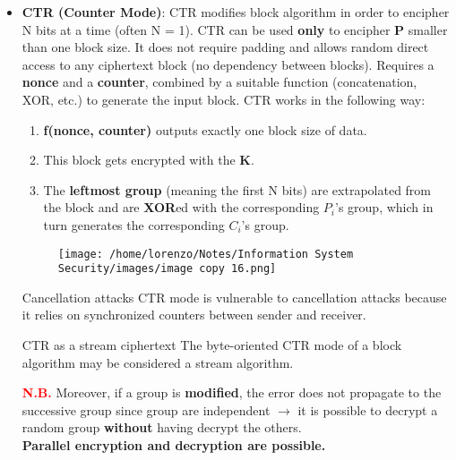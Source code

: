 \begin{itemize}
\begin{itemize}
    \vspace{0.1cm}
    \item \textbf{CTR (Counter Mode)}: CTR modifies block algorithm in order to encipher N bits at a time (often N = 1). CTR can be used \textbf{only} to encipher \textbf{P} smaller than one block size. It does not require padding and allows random direct access to any ciphertext block (no dependency between blocks). Requires a \textbf{nonce} and a \textbf{counter}, combined by a suitable function (concatenation, XOR, etc.) to generate the input block. CTR works in the following way:
    \begin{enumerate}
        \item \textbf{f(nonce, counter)} outputs exactly one block size of data.
        \item This block gets encrypted with the \textbf{K}.
        \item The \textbf{leftmost group} (meaning the first N bits) are extrapolated from the block and are \textbf{XOR}ed with the corresponding \(P_i\)’s group, which in turn generates the corresponding \(C_i\)’s group.
    \end{enumerate}
    \begin{figure}[H]
        \centering
        \texttt{[image: /home/lorenzo/Notes/Information System Security/images/image copy 16.png]}
    \end{figure}
    \begin{quotebox-red}{Cancellation attacks}
        CTR mode is vulnerable to cancellation attacks because it relies on synchronized counters between sender and receiver.    
    \end{quotebox-red}
    \begin{quotebox-yellow}{CTR as a stream ciphertext}
    The byte-oriented CTR mode of a block algorithm may be considered a stream algorithm.
    \end{quotebox-yellow}
    \textcolor{red}{\textbf{N.B.}} Moreover, if a group is \textbf{modified}, the error does not propagate to the successive group since group are independent \(\rightarrow \) it is possible to decrypt a random group \textbf{without} having decrypt the others.
    \\\textbf{Parallel encryption and decryption are possible.} 
\end{itemize}
\end{itemize}

